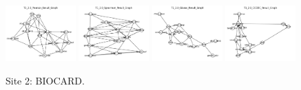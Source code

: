 \begin{figure}
    \includegraphics[width=0.24\textwidth]{chap6/figs/T1_2.0_Pearson_Result_Graph.png}
    \includegraphics[width=0.24\textwidth]{chap6/figs/T1_2.0_Spearman_Result_Graph.png}
    \includegraphics[width=0.24\textwidth]{chap6/figs/T1_2.0_Glasso_Result_Graph.png}
    \includegraphics[width=0.24\textwidth]{chap6/figs/T1_2.0_CODEC_Result_Graph.png}
    \caption{Site 2: BIOCARD.}
    \label{fig:site2}
\end{figure}